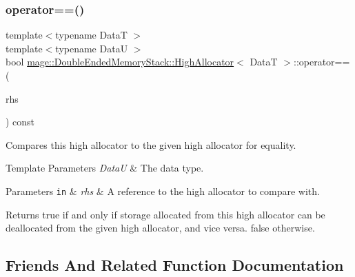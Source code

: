 \subsubsection{\texorpdfstring{operator==()}{operator==()}}
{\footnotesize\ttfamily template$<$typename DataT $>$ \\
template$<$typename DataU $>$ \\
bool \mbox{\hyperlink{classmage_1_1_double_ended_memory_stack_1_1_high_allocator}{mage\+::\+Double\+Ended\+Memory\+Stack\+::\+High\+Allocator}}$<$ DataT $>$\+::operator== (\begin{DoxyParamCaption}\item[{const \mbox{\hyperlink{classmage_1_1_double_ended_memory_stack_1_1_high_allocator}{High\+Allocator}}$<$ DataU $>$ \&}]{rhs }\end{DoxyParamCaption}) const\hspace{0.3cm}{\ttfamily [noexcept]}}

Compares this high allocator to the given high allocator for equality.


\begin{DoxyTemplParams}{Template Parameters}
{\em DataU} & The data type. \\
\hline
\end{DoxyTemplParams}

\begin{DoxyParams}[1]{Parameters}
\mbox{\tt in}  & {\em rhs} & A reference to the high allocator to compare with. \\
\hline
\end{DoxyParams}
\begin{DoxyReturn}{Returns}
{\ttfamily true} if and only if storage allocated from this high allocator can be deallocated from the given high allocator, and vice versa. {\ttfamily false} otherwise. 
\end{DoxyReturn}


\subsection{Friends And Related Function Documentation}
\mbox{\label{classmage_1_1_double_ended_memory_stack_1_1_high_allocator_a10ae729d55b8c0017057250445835680}} 
